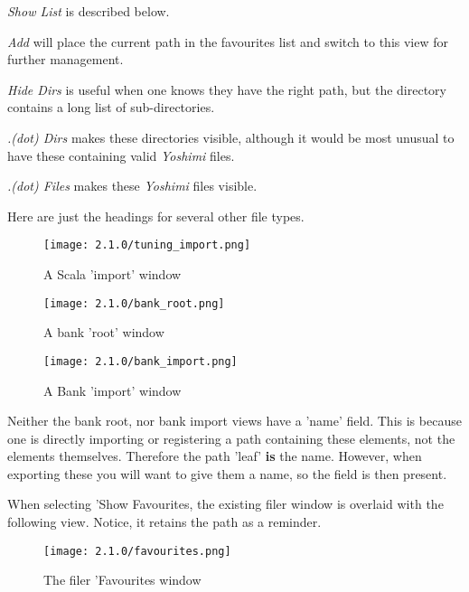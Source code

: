    \textsl{Show List} is described below.

   \textsl{Add} will place the current path in the favourites list and switch to
   this view for further management.

   \textsl{Hide Dirs} is useful when one knows they have the right path, but the
   directory contains a long list of sub-directories.

   \textsl{.(dot) Dirs} makes these directories visible, although it would be most
   unusual to have these containing valid \textsl{Yoshimi} files.

   \textsl{.(dot) Files} makes these \textsl{Yoshimi} files visible.


   Here are just the headings for several other file types.

\begin{figure}[H]
   \centering
   \texttt{[image: 2.1.0/tuning\_import.png]}
   \caption{A Scala 'import' window}
\end{figure}

\begin{figure}[H]
   \centering
   \texttt{[image: 2.1.0/bank\_root.png]}
   \caption{A bank 'root' window}
   \label{fig:filer_bank_root_window}
\end{figure}

\begin{figure}[H]
   \centering
   \texttt{[image: 2.1.0/bank\_import.png]}
   \caption{A Bank 'import' window}
   \label{fig:filer_bank_import_window}
\end{figure}

Neither the bank root, nor bank import views have a 'name' field. This is because one
is directly importing or registering a path containing these elements, not the elements themselves. Therefore the path 'leaf' \textbf{is} the name. However, when exporting
these you will want to give them a name, so the field is then present.


When selecting 'Show Favourites, the existing filer window is overlaid with the
following view. Notice, it retains the path as a reminder.
\begin{figure}[H]
   \centering
   \texttt{[image: 2.1.0/favourites.png]}
   \caption{The filer 'Favourites window}
   \label{fig:filer_favourites_window}
\end{figure}

